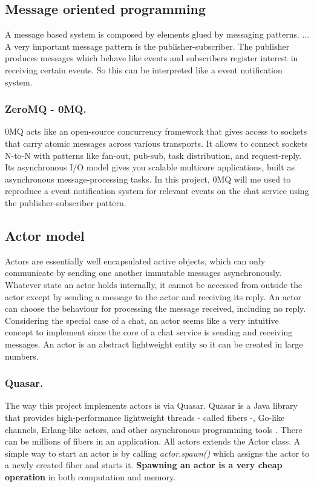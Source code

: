\subsection{Message oriented programming}

A message based system is composed by elements glued by messaging patterns. 
...
A very important message pattern is the publisher-subscriber. The publisher produces messages which behave like events and subscribers register interest in receiving certain events. So this can be interpreted like a event notification system.


\subsubsection{ZeroMQ - 0MQ.}
0MQ acts like an open-source concurrency framework that gives access to sockets that carry atomic messages across various transports. It allows to connect sockets N-to-N with patterns like fan-out, pub-sub, task distribution, and request-reply. Its asynchronous I/O model gives you scalable multicore applications, built as asynchronous message-processing tasks.
In this project, 0MQ will me used to reproduce a event notification system for relevant events on the chat service using the publisher-subscriber pattern.

\subsection{Actor model}

Actors are essentially well encapsulated active objects, which can only communicate by sending one another immutable messages asynchronously. Whatever state an actor holds internally, it cannot be accessed from outside the actor except by sending a message to the actor and receiving its reply. An actor can choose the behaviour for processing the message received, including no reply.
Considering the special case of a chat, an actor seems like a very intuitive concept to implement since the core of a chat service is sending and receiving messages. An actor is an abstract lightweight entity so it can be created in large numbers.

\subsubsection{Quasar.} 
The way this project implements actors is via Quasar. Quasar is a Java library that provides high-performance lightweight threads - called fibers -, Go-like channels, Erlang-like actors, and other asynchronous programming tools \cite{quasar}. There can be millions of fibers in an application. All actors extends the Actor class. A simple way to start an actor is by calling \emph{actor.spawn()} which assigns the actor to a newly created fiber and starts it. \textbf{Spawning an actor is a very cheap operation} in both computation and memory.




